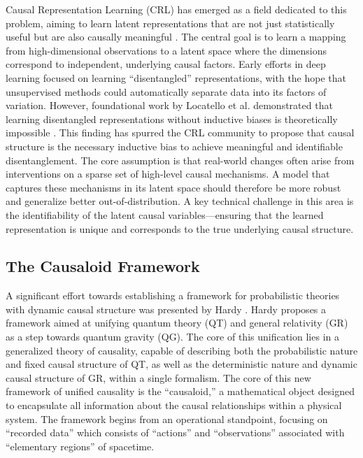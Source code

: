 {Causal Representation Learning (CRL) has emerged as a field dedicated to this problem, aiming to learn latent representations that are not just statistically useful but are also causally meaningful \cite{Scholkopf2021Toward}. The central goal is to learn a mapping from high-dimensional observations to a latent space where the dimensions correspond to independent, underlying causal factors.
Early efforts in deep learning focused on learning ``disentangled'' representations, with the hope that unsupervised methods could automatically separate data into its factors of variation. However, foundational work by Locatello et al. demonstrated that learning disentangled representations without inductive biases is theoretically impossible \cite{Locatello2019Challenging}. This finding has spurred the CRL community to propose that causal structure is the necessary inductive bias to achieve meaningful and identifiable disentanglement. The core assumption is that real-world changes often arise from interventions on a sparse set of high-level causal mechanisms. A model that captures these mechanisms in its latent space should therefore be more robust and generalize better out-of-distribution. A key technical challenge in this area is the identifiability of the latent causal variables—ensuring that the learned representation is unique and corresponds to the true underlying causal structure.

\subsection{The Causaloid Framework}

A significant effort towards establishing a framework for probabilistic theories with dynamic causal structure was presented by Hardy \cite{HardyDynamicCausalStructure}. Hardy proposes a framework aimed at unifying quantum theory (QT) and general relativity (GR) as a step towards quantum gravity (QG). The core of this unification lies in a generalized theory of causality, capable of describing both the probabilistic nature and fixed causal structure of QT, as well as the deterministic nature and dynamic causal structure of GR, within a single formalism. The core of this new framework of unified causality is the ``causaloid,'' a mathematical object designed to encapsulate all information about the causal relationships within a physical system. The framework begins from an operational standpoint, focusing on ``recorded data'' which consists of ``actions'' and ``observations'' associated with ``elementary regions'' of spacetime.

}
